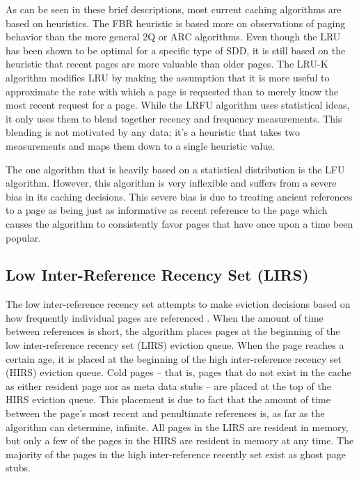   As can be seen in these brief descriptions, most current caching algorithms
  are based on heuristics. The FBR heuristic is based more on observations of
  paging behavior than the more general 2Q or ARC algorithms. Even though the
  LRU has been shown to be optimal for a specific type of SDD, it is still based
  on the heuristic that recent pages are more valuable than older pages. The
  LRU-K algorithm modifies LRU by making the assumption that it is more useful
  to approximate the rate with which a page is requested than to merely know the
  most recent request for a page. While the LRFU algorithm uses statistical
  ideas, it only uses them to blend together recency and frequency measurements.
  This blending is not motivated by any data; it's a heuristic that takes two
  measurements and maps them down to a single heuristic value.

  The one algorithm that is heavily based on a statistical distribution is the
  LFU algorithm. However, this algorithm is very inflexible and suffers from a
  severe bias in its caching decisions. This severe bias is due to treating
  ancient references to a page as being just as informative as recent reference
  to the page which causes the algorithm to consistently favor pages that have
  once upon a time been popular.

\subsection{Low Inter-Reference Recency Set (LIRS)}
  The low inter-reference recency set attempts to make eviction decisions based
  on how frequently individual pages are referenced \cite{jiang2002lirs}. When
  the amount of time between references is short, the algorithm places pages at
  the beginning of the low inter-reference recency set (LIRS) eviction queue.
  When the page reaches a certain age, it is placed at the beginning of the high
  inter-reference recency set (HIRS) eviction queue. Cold pages -- that is,
  pages that do not exist in the cache as either resident page nor as meta data
  stubs -- are placed at the top of the HIRS eviction queue.  This placement is
  due to fact that the amount of time between the page's most recent and
  penultimate references is, as far as the algorithm can determine, infinite.
  All pages in the LIRS are resident in memory, but only a few of the pages in
  the HIRS are resident in memory at any time. The majority of the pages in the
  high inter-reference recently set exist as ghost page stubs.

